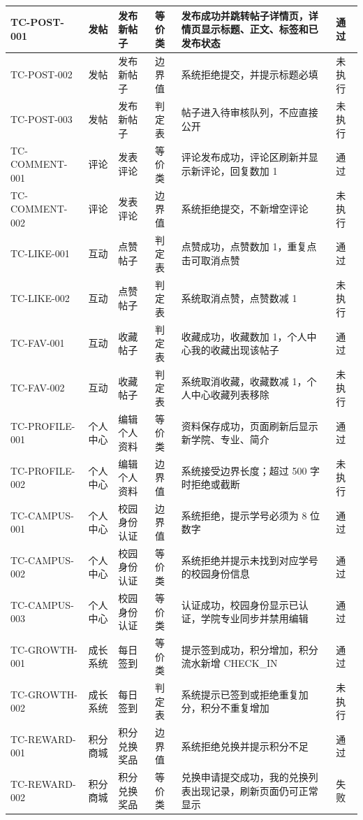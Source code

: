 \documentclass[bwprint]{report}
\begin{document}
\begin{longtable}{p{} p{} p{} p{} p{} p{}}
\hline
TC-POST-001 & 发帖 & 发布新帖子 & 等价类 & 发布成功并跳转帖子详情页，详情页显示标题、正文、标签和已发布状态 & 通过 \\
\hline
TC-POST-002 & 发帖 & 发布新帖子 & 边界值 & 系统拒绝提交，并提示标题必填 & 未执行 \\
\hline
TC-POST-003 & 发帖 & 发布新帖子 & 判定表 & 帖子进入待审核队列，不应直接公开 & 未执行 \\
\hline
TC-COMMENT-001 & 评论 & 发表评论 & 等价类 & 评论发布成功，评论区刷新并显示新评论，回复数加 1 & 通过 \\
\hline
TC-COMMENT-002 & 评论 & 发表评论 & 边界值 & 系统拒绝提交，不新增空评论 & 未执行 \\
\hline
TC-LIKE-001 & 互动 & 点赞帖子 & 判定表 & 点赞成功，点赞数加 1，重复点击可取消点赞 & 通过 \\
\hline
TC-LIKE-002 & 互动 & 点赞帖子 & 判定表 & 系统取消点赞，点赞数减 1 & 未执行 \\
\hline
TC-FAV-001 & 互动 & 收藏帖子 & 判定表 & 收藏成功，收藏数加 1，个人中心我的收藏出现该帖子 & 通过 \\
\hline
TC-FAV-002 & 互动 & 收藏帖子 & 判定表 & 系统取消收藏，收藏数减 1，个人中心收藏列表移除 & 未执行 \\
\hline
TC-PROFILE-001 & 个人中心 & 编辑个人资料 & 等价类 & 资料保存成功，页面刷新后显示新学院、专业、简介 & 通过 \\
\hline
TC-PROFILE-002 & 个人中心 & 编辑个人资料 & 边界值 & 系统接受边界长度；超过 500 字时拒绝或截断 & 未执行 \\
\hline
TC-CAMPUS-001 & 个人中心 & 校园身份认证 & 边界值 & 系统拒绝，提示学号必须为 8 位数字 & 通过 \\
\hline
TC-CAMPUS-002 & 个人中心 & 校园身份认证 & 等价类 & 系统拒绝并提示未找到对应学号的校园身份信息 & 通过 \\
\hline
TC-CAMPUS-003 & 个人中心 & 校园身份认证 & 等价类 & 认证成功，校园身份显示已认证，学院专业同步并禁用编辑 & 通过 \\
\hline
TC-GROWTH-001 & 成长系统 & 每日签到 & 等价类 & 提示签到成功，积分增加，积分流水新增 CHECK\_IN & 通过 \\
\hline
TC-GROWTH-002 & 成长系统 & 每日签到 & 判定表 & 系统提示已签到或拒绝重复加分，积分不重复增加 & 未执行 \\
\hline
TC-REWARD-001 & 积分商城 & 积分兑换奖品 & 边界值 & 系统拒绝兑换并提示积分不足 & 通过 \\
\hline
TC-REWARD-002 & 积分商城 & 积分兑换奖品 & 等价类 & 兑换申请提交成功，我的兑换列表出现记录，刷新页面仍可正常显示 & 失败 \\

\end{longtable}
\end{document}

